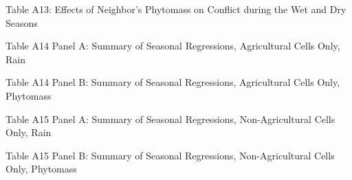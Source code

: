 \documentclass[pdf,letterpaper,11pt]{article}
\begin{document}
 \begin{table}[H]  \centering
  \begin{scriptsize}
\begin{threeparttable}
\caption*{Table A13: Effects of Neighbor's Phytomass on Conflict during the Wet and Dry Seasons}
 
 
   \end{threeparttable}
    \end{scriptsize}
\end{table}

 \begin{table}[H]  \centering
  \begin{scriptsize}
\begin{threeparttable}
\caption*{Table A14 Panel A: Summary of Seasonal Regressions, Agricultural Cells Only, Rain}
 
 
   \end{threeparttable}
    \end{scriptsize}
\end{table}

 \begin{table}[H]  \centering
  \begin{scriptsize}
\begin{threeparttable}
\caption*{Table A14 Panel B: Summary of Seasonal Regressions, Agricultural Cells Only, Phytomass}
 
 
   \end{threeparttable}
    \end{scriptsize}
\end{table}

 \begin{table}[H]  \centering
  \begin{scriptsize}
\begin{threeparttable}
\caption*{Table A15 Panel A: Summary of Seasonal Regressions, Non-Agricultural Cells Only, Rain}
 
 
   \end{threeparttable}
    \end{scriptsize}
\end{table}

 \begin{table}[H]  \centering
  \begin{scriptsize}
\begin{threeparttable}
\caption*{Table A15 Panel B: Summary of Seasonal Regressions, Non-Agricultural Cells Only, Phytomass}
 
 
   \end{threeparttable}
    \end{scriptsize}
\end{table}
\end{document}
